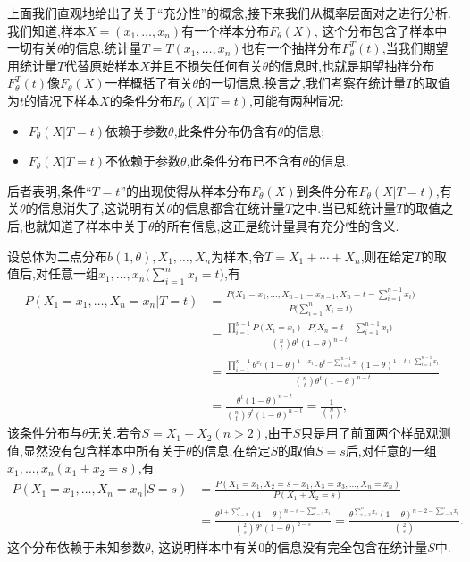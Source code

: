 上面我们直观地给出了关于``充分性''的概念,接下来我们从概率层面对之进行分析.我们知道,样本$ X=(x_1,\dotsc,x_n)$有一个样本分布$F_\theta( X)$, 这个分布包含了样本中一切有关$\theta$的信息.统计量$T=T(x_1,\dotsc,x_n)$也有一个抽样分布$F_\theta^T(t)$,当我们期望用统计量$T$代替原始样本$X$并且不损失任何有关$\theta$的信息时,也就是期望抽样分布$F_\theta^T(t)$像$F_\theta(X)$一样概括了有关$\theta$的一切信息.换言之,我们考察在统计量$T$的取值为$t$的情况下样本$X$的条件分布$F_\theta(X|T=t)$,可能有两种情况:
\begin{itemize}
\item $F_\theta(X|T=t)$依赖于参数$\theta$,此条件分布仍含有$\theta$的信息;
\item $F_\theta(X|T=t)$不依赖于参数$\theta$,此条件分布已不含有$\theta$的信息.
\end{itemize}
后者表明,条件``$T=t$''的出现使得从样本分布$F_\theta(X)$到条件分布$F_\theta(X|T=t)$,有关$\theta$的信息消失了,这说明有关$\theta$的信息都含在统计量$T$之中.当已知统计量$T$的取值之后,也就知道了样本中关于$\theta$的所有信息,这正是统计量具有充分性的含义.
\begin{example}\label{exam:5.5.2}
设总体为二点分布$b(1,\theta),X_1,\dotsc,X_n$为样本,令$T=X_1+\dotsb+X_n$,则在给定$T$的取值后,对任意一组$x_1,\dotsc,x_n\bigl(\sum_{i=1}^nx_i=t\bigr)$,有
\begin{align*}
P(X_1=x_1,\dotsc,X_n=x_n|T=t)&=\frac{P\bigl(X_1=x_1,\dotsc,X_{n-1}=x_{n-1},X_n
=t-\sum_{i=1}^{n-1}x_i\bigr)}{P\bigl(\sum_{i=1}^nX_i=t\bigr)}\\
&=\frac{\prod_{i=1}^{n-1}P(X_i=x_i)\cdot P\bigl(X_n=t-\sum_{i=1}^{n-1}x_i\bigr)}
{\binom nt\theta^t(1-\theta)^{n-t}}\\
&=\frac{\prod_{i=1}^{n-1}\theta^{x_i}(1-\theta)^{1-x_i}\cdot\theta^{t-\sum_{i=1}^{n-1}x_i}
(1-\theta)^{1-t+\sum_{i=1}^{n-1}x_i}}{\binom nt\theta^t(1-\theta)^{n-t}}\\
&=\frac{\theta^t(1-\theta)^{n-t}}{\binom nt\theta^t(1-\theta)^{n-t}}=\frac1{\binom nt},
\end{align*}
该条件分布与$\theta$无关.若令$S=X_1+X_2(n>2)$,由于$S$只是用了前面两个样品观测值,显然没有包含样本中所有关于$\theta$的信息,在给定$S$的取值$S=s$后,对任意的一组$x_1,\dotsc,x_n(x_1+x_2=s)$,有
\begin{align*}
P(X_1=x_1,\dotsc,X_n=x_n|S=s)&=\frac{P(X_1=x_1,X_2=s-x_1,X_3=x_3,\dotsc,X_n=x_n)}{P(X_1+X_2=s)}\\
&=\frac{\theta^{1+\sum_{i=3}^n}(1-\theta)^{n-s-\sum_{i=3}^nx_i}}{\binom 2s\theta^s(1-\theta)^{2-s}}
=\frac{\theta^{\sum_{i=3}^nx_i}(1-\theta)^{n-2-\sum_{i=3}^nx_i}}{\binom2s}.
\end{align*}
这个分布依赖于未知参数$\theta$, 这说明样本中有关0的信息没有完全包含在统计量$S$中.
\end{example}


